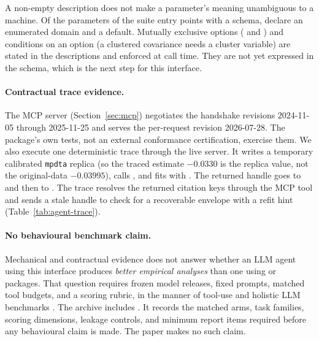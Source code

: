 A non-empty description does not make a parameter's meaning unambiguous to a
machine. Of the \SuiteSchemaParameters{} parameters of the
\SuiteSchemaEntries{} suite entry points with a schema, \SuiteSchemaEnum{}
declare an enumerated domain and \SuiteSchemaDefault{} a default. Mutually
exclusive options ( and ) and conditions on an
option (a clustered covariance needs a cluster variable) are stated in the
descriptions and enforced at call time. They are not yet expressed in the
schema, which is the next step for this interface.

\paragraph{Contractual trace evidence.}\label{sec:agentbench-procedural}

The MCP server (Section~\ref{sec:mcp}) negotiates the handshake revisions
2024-11-05 through 2025-11-25 and serves the per-request revision 2026-07-28.
The package's own tests, not an external conformance certification, exercise
them. We also execute one deterministic trace through the live server. It
writes a temporary calibrated \texttt{mpdta} replica (so the traced estimate
\(-0.0330\) is the replica value, not the original-data \(-0.03995\)), calls
, and fits  with
. The returned handle goes to  and
then to . The trace resolves the returned
citation keys through the MCP  tool and sends a stale handle to
check for a recoverable  envelope with a refit hint
(Table~\ref{tab:agent-trace}).

\begin{table}[t]
\centering\small

\caption{Deterministic MCP trace, including one recoverable stale-handle
error. The normalized transcript is in the replication archive.}
\label{tab:agent-trace}
\end{table}

\paragraph{No behavioural benchmark claim.}\label{sec:agentbench-behavioural}

Mechanical and contractual evidence does not answer whether an LLM agent
using this interface produces \emph{better empirical analyses} than one using
 or  packages. That question requires frozen
model releases, fixed prompts, matched tool budgets, and a scoring rubric, in
the manner of tool-use and holistic LLM benchmarks
\citep{patil2024gorilla,liang2023helm}. The archive
includes
.
It records the matched arms, task families, scoring dimensions, leakage
controls, and minimum report items required before any behavioural claim is
made. The paper makes no such claim.
